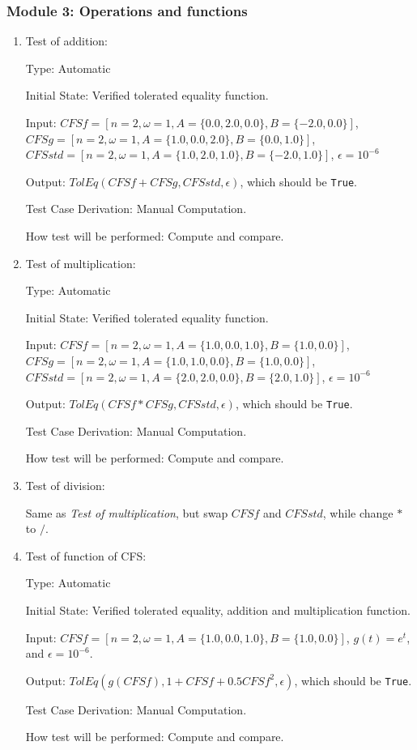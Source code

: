 \documentclass[12pt, titlepage]{article}
\newcommand{\li}[1]{\texttt{#1}}
\begin{document}
\subsubsection{Module 3: Operations and functions}

\begin{enumerate}
	\item{Test of addition: \\}
	
	Type: Automatic
	
	Initial State: Verified tolerated equality function.
	
	Input: $\mathit{CFSf}=[n=2,\omega=1, A=\{0.0, 2.0, 0.0\}, B=\{-2.0, 0.0\}]$, $\mathit{CFSg}=[n=2,\omega=1, A=\{1.0, 0.0, 2.0\}, B=\{0.0, 1.0\}]$,
	$\mathit{CFSstd}=[n=2,\omega=1, A=\{1.0, 2.0, 1.0\}, B=\{-2.0, 1.0\}]$,
	$\epsilon=10^{-6}$
	
	Output: $\mathit{TolEq}(\mathit{CFSf}+\mathit{CFSg}, \mathit{CFSstd}, \epsilon)$, which should be \li{True}.
	
	Test Case Derivation: Manual Computation.
	
	How test will be performed: Compute and compare.
	
	\item{Test of multiplication:\\}
	
	Type: Automatic
	
	Initial State: Verified tolerated equality function.
	
	Input: $\mathit{CFSf}=[n=2, \omega=1, A=\{1.0, 0.0, 1.0\}, B=\{1.0, 0.0\}]$,
	$\mathit{CFSg}=[n=2, \omega=1, A=\{1.0, 1.0, 0.0\}, B=\{1.0, 0.0\}]$, 
	$\mathit{CFSstd}=[n=2, \omega=1, A=\{2.0, 2.0, 0.0\}, B=\{2.0, 1.0\}]$,
	$\epsilon=10^{-6}$
	
	Output: $\mathit{TolEq}(\mathit{CFSf}*\mathit{CFSg}, \mathit{CFSstd}, \epsilon)$, which should be \li{True}.
	
	Test Case Derivation: Manual Computation.
	
	How test will be performed: Compute and compare.
	
	\item{Test of division: \\}
	
	Same as \textit{Test of multiplication}, but swap $\mathit{CFSf}$ and $\mathit{CFSstd}$, while change $*$ to $/$.
	
	\item{Test of function of CFS: \\}
	
	Type: Automatic
	
	Initial State: Verified tolerated equality, addition and multiplication function.
	
	Input: $\mathit{CFSf}=[n=2, \omega=1, A=\{1.0, 0.0, 1.0\}, B=\{1.0, 0.0\}]$, $g(t)=e^t$, and $\epsilon=10^{-6}$.
	
	Output: $\mathit{TolEq}(g(\mathit{CFSf}), 1+\mathit{CFSf}+0.5\mathit{CFSf}^2, \epsilon)$, which should be \li{True}.
	
	Test Case Derivation: Manual Computation.
	
	How test will be performed: Compute and compare.
	
\end{enumerate}
\end{document}
